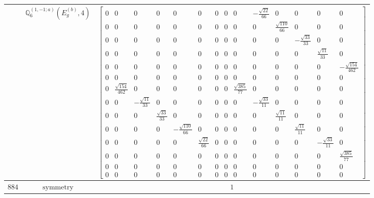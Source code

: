 \documentclass[fleqn,8pt,landscape]{jsarticle}
\begin{document}
\begin{longtable}{ccc}
$  $ & $ \mathbb{Q}_{6}^{(1,-1;a)}(E_{g}^{(b)},4) $ & $ \begin{bmatrix} 0 & 0 & 0 & 0 & 0 & 0 & 0 & 0 & 0 & - \frac{\sqrt{22}}{66} & 0 & 0 & 0 & 0 \\ 0 & 0 & 0 & 0 & 0 & 0 & 0 & 0 & 0 & 0 & \frac{\sqrt{110}}{66} & 0 & 0 & 0 \\ 0 & 0 & 0 & 0 & 0 & 0 & 0 & 0 & 0 & 0 & 0 & - \frac{\sqrt{33}}{33} & 0 & 0 \\ 0 & 0 & 0 & 0 & 0 & 0 & 0 & 0 & 0 & 0 & 0 & 0 & \frac{\sqrt{11}}{33} & 0 \\ 0 & 0 & 0 & 0 & 0 & 0 & 0 & 0 & 0 & 0 & 0 & 0 & 0 & - \frac{\sqrt{154}}{462} \\ 0 & 0 & 0 & 0 & 0 & 0 & 0 & 0 & 0 & 0 & 0 & 0 & 0 & 0 \\ 0 & \frac{\sqrt{154}}{462} & 0 & 0 & 0 & 0 & 0 & 0 & \frac{\sqrt{385}}{77} & 0 & 0 & 0 & 0 & 0 \\ 0 & 0 & - \frac{\sqrt{11}}{33} & 0 & 0 & 0 & 0 & 0 & 0 & - \frac{\sqrt{33}}{11} & 0 & 0 & 0 & 0 \\ 0 & 0 & 0 & \frac{\sqrt{33}}{33} & 0 & 0 & 0 & 0 & 0 & 0 & \frac{\sqrt{11}}{11} & 0 & 0 & 0 \\ 0 & 0 & 0 & 0 & - \frac{\sqrt{110}}{66} & 0 & 0 & 0 & 0 & 0 & 0 & \frac{\sqrt{11}}{11} & 0 & 0 \\ 0 & 0 & 0 & 0 & 0 & \frac{\sqrt{22}}{66} & 0 & 0 & 0 & 0 & 0 & 0 & - \frac{\sqrt{33}}{11} & 0 \\ 0 & 0 & 0 & 0 & 0 & 0 & 0 & 0 & 0 & 0 & 0 & 0 & 0 & \frac{\sqrt{385}}{77} \\ 0 & 0 & 0 & 0 & 0 & 0 & 0 & 0 & 0 & 0 & 0 & 0 & 0 & 0 \\ 0 & 0 & 0 & 0 & 0 & 0 & 0 & 0 & 0 & 0 & 0 & 0 & 0 & 0 \end{bmatrix} $ \\ \hline
$ 884 $ & $ \text{symmetry} $ & $ 1 $ \\

\end{longtable}
\end{document}
